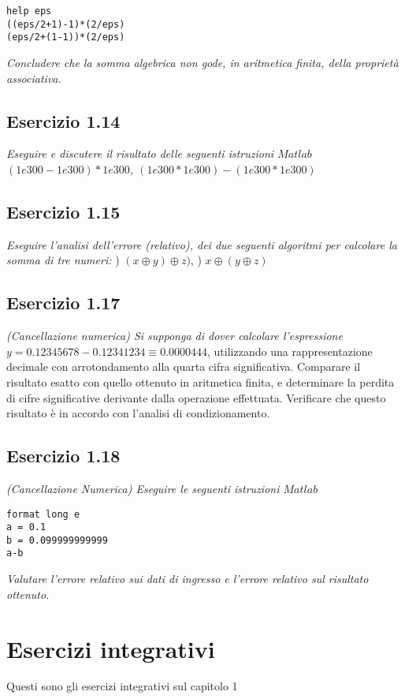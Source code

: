 \lstset{language=Matlab}
\begin{lstlisting}
help eps
((eps/2+1)-1)*(2/eps)
(eps/2+(1-1))*(2/eps)
\end{lstlisting}
\emph{Concludere che la somma algebrica non gode, in aritmetica finita, della proprietà associativa.}

\subsection{Esercizio 1.14}
\emph{Eseguire e discutere il risultato delle seguenti istruzioni $Matlab$}
\emph{\center $(1e300-1e300)*1e300$, \qquad $(1e300*1e300)-(1e300*1e300)$}
\flushleft

\subsection{Esercizio 1.15}
\emph{Eseguire l'analisi dell'errore (relativo), dei due seguenti algoritmi per calcolare la somma di tre numeri:}
) $ (x\oplus y) \oplus z) $, ) $x\oplus(y\oplus z)$
\flushleft

\subsection{Esercizio 1.17}
\emph{(Cancellazione numerica) Si supponga di dover calcolare l'espressione }
\center $ y = 0.12345678-0.12341234 \equiv 0.0000444$,
\flushleft utilizzando una rappresentazione decimale con arrotondamento alla quarta cifra significativa. Comparare il risultato esatto con quello ottenuto in aritmetica finita, e determinare la perdita di cifre significative derivante dalla operazione effettuata. Verificare che questo risultato è in accordo con l'analisi di condizionamento.

\subsection{Esercizio 1.18}
\emph{(Cancellazione Numerica) Eseguire le seguenti istruzioni $Matlab$}

\lstset{language=Matlab}
\begin{lstlisting}
format long e
a = 0.1 
b = 0.099999999999
a-b
\end{lstlisting}
\emph{Valutare l'errore relativo sui dati di ingresso e l'errore relativo sul risultato ottenuto.}

\section{Esercizi integrativi}
Questi sono gli esercizi integrativi sul capitolo 1


